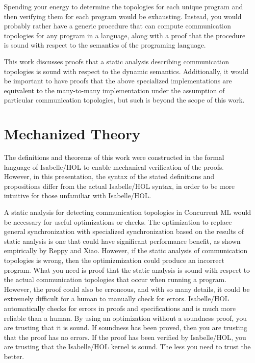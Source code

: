 \documentclass[letterpaper, 11pt]{extarticle}
\begin{document}
Spending your energy to determine the topologies for each unique program and then verifying
them for each program would be exhausting. Instead, you would probably rather have a generic
procedure that can compute communication topologies for any program in a language, along with
a proof that the procedure is sound with respect to the semantics of the programing language.

This work discusses proofs that a static analysis describing communication topologies is
sound with respect to the dynamic semantics.
Additionally, it would be important to have proofs that the above specialized
implementations are equivalent to the many-to-many implementation under the assumption of
particular communication topologies, but such is beyond the scope of this work.

\section{Mechanized Theory}

The definitions and theorems of this work were constructed in the formal
language of Isabelle/HOL to enable mechanical verification of the proofs.
However, in this presentation, the syntax of the stated definitions and propositions differ from
the actual Isabelle/HOL syntax, in order to be more intuitive for those unfamiliar with Isabelle/HOL.

A static analysis for detecting communication topologies in Concurrent ML would be necessary for useful
optimizations or checks. The optimization to replace general synchronization with specialized synchronization
based on the results of static analysis is one that could have significant performance benefit, as shown
empirically by Reppy and Xiao. However, if the static analysis of communication topologies is wrong, then
the optimizmization could produce an incorrect program. What you need is proof that the static analysis is sound
with respect to the actual communication topologies that occur when running a program. However, the proof could also be
erroneous, and with so many details, it could be extremely difficult for a human to manually check for errors.
Isabelle/HOL automatically checks for errors in proofs and specifications and is much more reliable than a
human. By using an optimization without a soundness proof, you are trusting that it is sound. If soundness has
been proved, then you are trusting that the proof has no errors. If the proof has been verified by Isabelle/HOL, 
you are trusting that the Isabelle/HOL kernel is sound. The less you need to trust the better.
\end{document}
